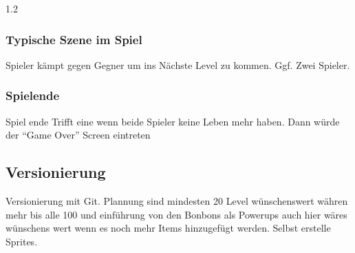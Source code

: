 \documentclass{article}
\newcommand{\Zeilenabstand}{1.2}
\begin{document}
\begin{spacing}{\Zeilenabstand}
\subsubsection{Typische Szene im Spiel}

Spieler kämpt gegen Gegner um ins Nächste Level zu kommen. Ggf. Zwei Spieler.

\subsubsection{Spielende}

Spiel ende Trifft eine wenn beide Spieler keine Leben mehr haben. Dann würde der  ``Game Over''  Screen eintreten 

\subsection{Versionierung}

Versionierung mit Git.
Plannung sind mindesten 20 Level wünschenswert währen mehr bis alle 100 und einführung von den Bonbons als Powerups auch hier wäres wünschens wert wenn es noch mehr Items hinzugefügt werden.
Selbst erstelle Sprites. 


\end{spacing}
\end{document}
